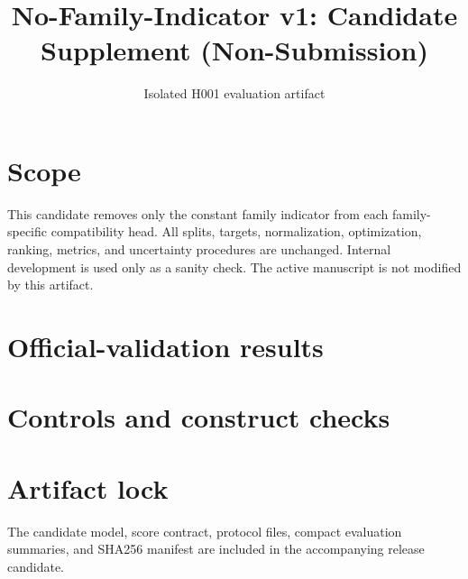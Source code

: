 \documentclass[10pt]{article}
\title{No-Family-Indicator v1: Candidate Supplement (Non-Submission)}
\author{Isolated H001 evaluation artifact}
\date{}
\begin{document}
\maketitle
\section{Scope}
This candidate removes only the constant family indicator from each family-specific compatibility head. All splits, targets, normalization, optimization, ranking, metrics, and uncertainty procedures are unchanged. Internal development is used only as a sanity check. The active manuscript is not modified by this artifact.
\section{Official-validation results}


\section{Controls and construct checks}






\section{Artifact lock}
The candidate model, score contract, protocol files, compact evaluation summaries, and SHA256 manifest are included in the accompanying release candidate.
\end{document}
